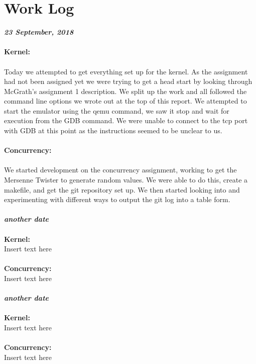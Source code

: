 \documentclass{article}
\begin{document}
\section{Work Log}

\textit{\textbf{23 September, 2018}} \\\\
\textbf{Kernel:} \\\\
\indent Today we attempted to get everything set up for the kernel. As the assignment had not been assigned yet we were trying to get a head start by looking through McGrath's assignment 1 description. We split up the work and all followed the command line options we wrote out at the top of this report. We attempted to start the emulator using the qemu command, we saw it stop and wait for execution from the GDB command. We were unable to connect to the tcp port with GDB at this point as the instructions seemed to be unclear to us.
\\\\
\textbf{Concurrency:} \\\\
\indent We started development on the concurrency assignment, working to get the Mersenne Twister to generate random values. We were able to do this, create a makefile, and get the git repository set up. We then started looking into and experimenting with different ways to output the git log into a table form.
\\\\

\noindent
\textit{\textbf{another date}} \\\\
\textbf{Kernel:} \\
\indent Insert text here
\\\\
\textbf{Concurrency:} \\
\indent Insert text here
\\\\

\noindent
\textit{\textbf{another date}} \\\\
\textbf{Kernel:} \\
\indent Insert text here
\\\\
\textbf{Concurrency:} \\
\indent Insert text here
\\\\
\end{document}
